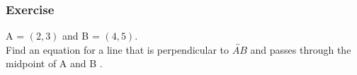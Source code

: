 \documentclass[12pt]{beamer}
\begin{document}
\begin{frame}
	\frametitle{Exercise}
	\vspace*{\fill}
	\vspace*{\fill}
	\vspace*{\fill}
	\vspace*{\fill}
	\initclock
	A = $(2, 3)$ and B = $(4, 5)$.\\
	\vspace*{\fill}
	Find an equation for a line that is perpendicular to $\overleftrightarrow{AB}$ and passes through the midpoint of A and B .\\
	\vspace*{\fill}
	\vspace*{\fill}
	\vspace*{\fill}
	\vspace*{\fill}
	\crono
\end{frame}
\end{document}
